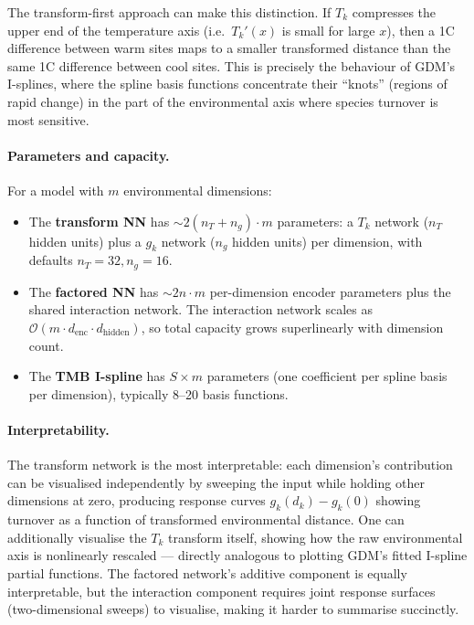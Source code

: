 \documentclass{article}
\begin{document}
The transform-first approach can make this distinction. If $T_k$ compresses the upper end of the temperature axis (i.e.\ $T_k'(x)$ is small for large $x$), then a 1\textdegree C difference between warm sites maps to a smaller transformed distance than the same 1\textdegree C difference between cool sites. This is precisely the behaviour of GDM's I-splines, where the spline basis functions concentrate their ``knots'' (regions of rapid change) in the part of the environmental axis where species turnover is most sensitive.

\paragraph{Parameters and capacity.}
For a model with $m$ environmental dimensions:
\begin{itemize}
    \item The \textbf{transform NN} has $\sim 2(n_T + n_g) \cdot m$ parameters: a $T_k$ network ($n_T$ hidden units) plus a $g_k$ network ($n_g$ hidden units) per dimension, with defaults $n_T = 32, n_g = 16$.
    \item The \textbf{factored NN} has $\sim 2n \cdot m$ per-dimension encoder parameters plus the shared interaction network. The interaction network scales as $\mathcal{O}(m \cdot d_{\text{enc}} \cdot d_{\text{hidden}})$, so total capacity grows superlinearly with dimension count.
    \item The \textbf{TMB I-spline} has $S \times m$ parameters (one coefficient per spline basis per dimension), typically 8--20 basis functions.
\end{itemize}

\paragraph{Interpretability.}
The transform network is the most interpretable: each dimension's contribution can be visualised independently by sweeping the input while holding other dimensions at zero, producing response curves $g_k(d_k) - g_k(0)$ showing turnover as a function of transformed environmental distance. One can additionally visualise the $T_k$ transform itself, showing how the raw environmental axis is nonlinearly rescaled --- directly analogous to plotting GDM's fitted I-spline partial functions. The factored network's additive component is equally interpretable, but the interaction component requires joint response surfaces (two-dimensional sweeps) to visualise, making it harder to summarise succinctly.
\end{document}
